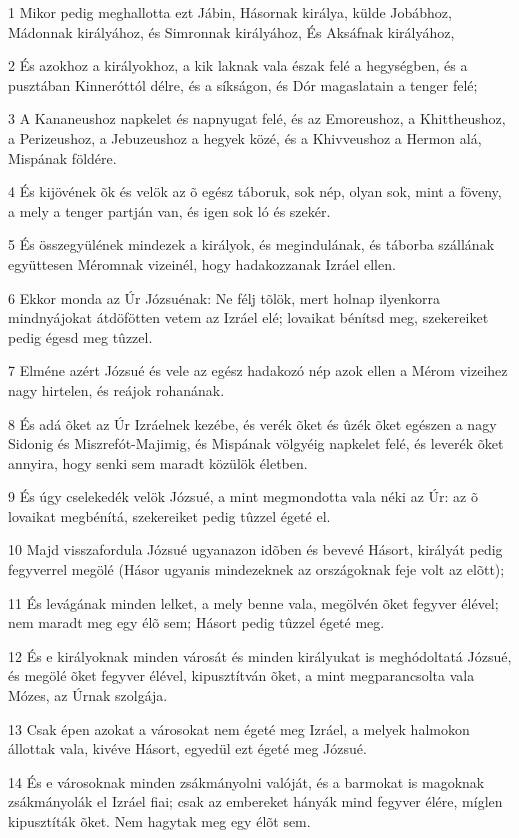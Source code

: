 \par 1 Mikor pedig meghallotta ezt Jábin, Hásornak királya, külde Jobábhoz, Mádonnak királyához, és Simronnak királyához, És Aksáfnak királyához,
\par 2 És azokhoz a királyokhoz, a kik laknak vala észak felé a hegységben, és a pusztában Kinneróttól délre, és a síkságon, és Dór magaslatain a tenger felé;
\par 3 A Kananeushoz napkelet és napnyugat felé, és az Emoreushoz, a Khittheushoz, a Perizeushoz, a Jebuzeushoz a hegyek közé, és a Khivveushoz a Hermon alá, Mispának földére.
\par 4 És kijövének õk és velök az õ egész táboruk, sok nép, olyan sok, mint a föveny, a mely a tenger partján van, és igen sok ló és szekér.
\par 5 És összegyülének mindezek a királyok, és megindulának, és táborba szállának együttesen Méromnak vizeinél, hogy hadakozzanak Izráel ellen.
\par 6 Ekkor monda az Úr Józsuénak: Ne félj tõlök, mert holnap ilyenkorra mindnyájokat átdöfötten vetem az Izráel elé; lovaikat bénítsd meg, szekereiket  pedig égesd meg tûzzel.
\par 7 Elméne azért Józsué és vele az egész hadakozó nép azok ellen a Mérom vizeihez nagy hirtelen, és reájok rohanának.
\par 8 És adá õket az Úr Izráelnek kezébe, és verék õket és ûzék õket egészen a nagy Sidonig és Miszrefót-Majimig, és Mispának völgyéig napkelet felé, és leverék õket annyira, hogy senki sem maradt közülök életben.
\par 9 És úgy cselekedék velök Józsué, a mint megmondotta vala néki az Úr: az õ lovaikat megbénítá, szekereiket pedig tûzzel égeté el.
\par 10 Majd visszafordula Józsué ugyanazon idõben és bevevé Hásort, királyát pedig fegyverrel megölé (Hásor ugyanis mindezeknek az országoknak feje volt az elõtt);
\par 11 És levágának minden lelket, a mely benne vala, megölvén õket fegyver élével; nem maradt meg egy élõ sem; Hásort pedig tûzzel égeté meg.
\par 12 És e királyoknak minden városát és minden királyukat is meghódoltatá Józsué, és megölé õket fegyver élével, kipusztítván õket, a mint megparancsolta vala Mózes, az Úrnak szolgája.
\par 13 Csak épen azokat a városokat nem égeté meg Izráel, a melyek halmokon állottak vala, kivéve Hásort, egyedül ezt égeté meg Józsué.
\par 14 És e városoknak minden zsákmányolni valóját, és a barmokat is magoknak zsákmányolák el Izráel fiai; csak az embereket hányák mind fegyver élére, míglen kipusztíták õket. Nem hagytak meg egy élõt sem.
